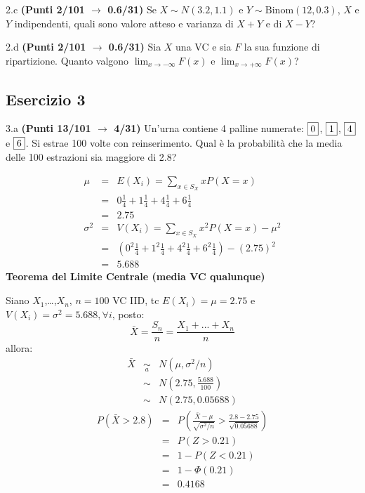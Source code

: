 \documentclass[
  11pt,
]{book}
\theoremstyle{mytheoremstyle}
\theoremstyle{mydefstyle}
\newenvironment{sol}
  {
  \begin{tcolorbox}[enhanced,breakable,arc=0.1mm,boxrule=1pt,colback=white,colframe=iblue,
  title=\bf \fontfamily{lmss}\selectfont \hspace{.5 cm} Soluzione,drop fuzzy shadow]

}{
\end{tcolorbox}
  }
\begin{document}
2.c \textbf{(Punti 2/101 \(\rightarrow\) 0.6/31)} Se \(X\sim N(3.2,1.1)\) e \(Y\sim\text{Binom}(12,0.3)\), \(X\) e \(Y\) indipendenti, quali sono valore atteso e varianza di \(X+Y\) e di \(X-Y\)?

2.d \textbf{(Punti 2/101 \(\rightarrow\) 0.6/31)} Sia \(X\) una VC e sia \(F\) la sua funzione di ripartizione. Quanto valgono \(\lim_{x\to-\infty}F(x)\) e \(\lim_{x\to+\infty}F(x)\)?

\subsection{Esercizio 3}\label{esercizio-3-20}

3.a \textbf{(Punti 13/101 \(\rightarrow\) 4/31)} Un'urna contiene 4 palline numerate: \(\fbox{0}\), \(\fbox{1}\), \(\fbox{4}\) e \(\fbox{6}\). Si estrae 100 volte con reinserimento. Qual è la probabilità che la media delle 100 estrazioni sia maggiore di 2.8?

\begin{sol}
\begin{eqnarray*} \mu &=& E(X_i) = \sum_{x\in S_X}x P(X=x)\\ 
 &=&  0  \frac { 1 }{ 4 }+ 1  \frac { 1 }{ 4 }+ 4  \frac { 1 }{ 4 }+ 6  \frac { 1 }{ 4 } \\ 
            &=& 2.75 \\ 
 \sigma^2 &=& V(X_i) = \sum_{x\in S_X}x^2 P(X=x)-\mu^2\\ 
 &=&\left(  0  ^2\frac { 1 }{ 4 }+ 1  ^2\frac { 1 }{ 4 }+ 4  ^2\frac { 1 }{ 4 }+ 6  ^2\frac { 1 }{ 4 } \right)-( 2.75 )^2\\ 
            &=& 5.688 
\end{eqnarray*}
\textbf{Teorema del Limite Centrale (media VC qualunque)}

Siano \(X_1\),\ldots,\(X_n\), \(n=100\) VC IID, tc \(E(X_i)=\mu=2.75\) e \(V(X_i)=\sigma^2=5.688,\forall i\), posto:
\[
      \bar X=\frac{S_n}n =\frac{X_1 + ... + X_n}n
      \]
allora:\begin{eqnarray*}
  \bar X & \mathop{\sim}\limits_{a}& N(\mu,\sigma^2/n) \\
     &\sim & N\left(2.75,\frac{5.688}{100}\right) \\
     &\sim & N(2.75,0.05688)
  \end{eqnarray*}\begin{eqnarray*}
      P( \bar X   >   2.8 ) 
        &=& P\left(  \frac { \bar X  -  \mu }{ \sqrt{\sigma^2/n} }  >  \frac { 2.8  -  2.75 }{\sqrt{ 0.05688 }} \right)  \\
                 &=& P\left(  Z   >   0.21 \right) \\    &=& 1-P(Z< 0.21 )\\ 
                 &=&  1-\Phi( 0.21 ) \\ &=&  0.4168 
      \end{eqnarray*}

\end{sol}
\end{document}
